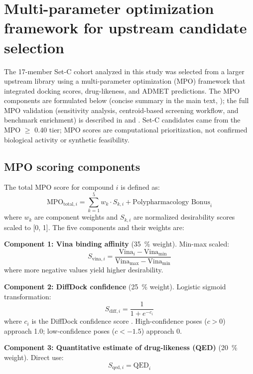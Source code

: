 \documentclass[journal=jcisd8,manuscript=suppinfo]{achemso}
\begin{document}
\section{Multi-parameter optimization framework for upstream candidate selection}\label{sec:sm_mpo}
The 17-member Set-C cohort analyzed in this study was selected from a larger upstream library using a multi-parameter optimization (MPO) framework that integrated docking scores, drug-likeness, and ADMET predictions. The MPO components are formulated below (concise summary in the main text, ); the full MPO validation (sensitivity analysis, centroid-based screening workflow, and benchmark enrichment) is described in  and . Set-C candidates came from the MPO $\geq$ \num{0.40} tier; MPO scores are computational prioritization, not confirmed biological activity or synthetic feasibility.

\subsection{MPO scoring components}\label{sec:sm_mpo_components}
The total MPO score for compound $i$ is defined as:
\begin{equation}
\text{MPO}_{\text{total}, i} = \sum_{k=1}^{5} w_k \cdot S_{k,i} + \text{Polypharmacology Bonus}_i
\label{eq:sm_mpo_total}
\end{equation}
where $w_k$ are component weights and $S_{k,i}$ are normalized desirability scores scaled to [\num{0}, \num{1}]. The five components and their weights are:

\textbf{Component 1: Vina binding affinity} (\qty{35}{\percent} weight). Min-max scaled:
\begin{equation}
S_{\text{vina}, i} = \frac{\text{Vina}_i - \text{Vina}_{\min}}{\text{Vina}_{\max} - \text{Vina}_{\min}}
\label{eq:sm_vina}
\end{equation}
where more negative values yield higher desirability.

\textbf{Component 2: DiffDock confidence} (\qty{25}{\percent} weight). Logistic sigmoid transformation:
\begin{equation}
S_{\text{diff}, i} = \frac{1}{1 + e^{-c_i}}
\label{eq:sm_diffdock}
\end{equation}
where $c_i$ is the DiffDock confidence score \cite{Corso2023}. High-confidence poses ($c > \num{0}$) approach \num{1.0}; low-confidence poses ($c < \num{-1.5}$) approach \num{0}.

\textbf{Component 3: Quantitative estimate of drug-likeness (QED)} (\qty{20}{\percent} weight). Direct use:
\begin{equation}
S_{\text{qed}, i} = \text{QED}_i
\label{eq:sm_qed}
\end{equation}
\end{document}
